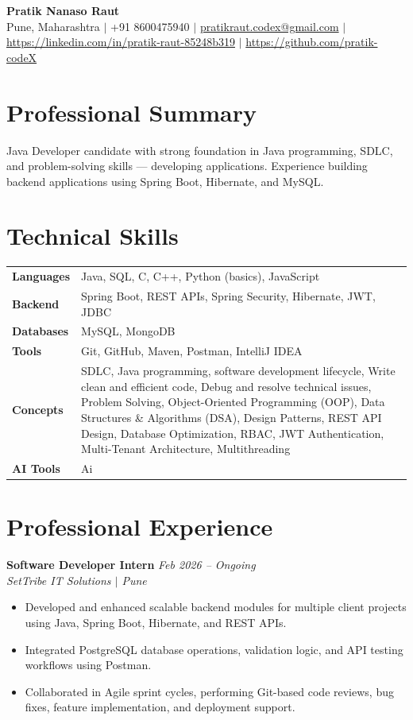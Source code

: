 \documentclass[10.5pt,a4paper]{article}
\begin{document}
\begin{center}
{\Large\bfseries Pratik Nanaso Raut}\\[2pt]
Pune, Maharashtra $|$ +91 8600475940 $|$ \href{mailto:pratikraut.codex@gmail.com}{pratikraut.codex@gmail.com} $|$ \href{https://linkedin.com/in/pratik-raut-85248b319}{https://linkedin.com/in/pratik-raut-85248b319} $|$ \href{https://github.com/pratik-codeX}{https://github.com/pratik-codeX}
\end{center}
\vspace{-2pt}
\section{Professional Summary}
Java Developer candidate with strong foundation in Java programming, SDLC, and problem-solving skills — developing applications. Experience building backend applications using Spring Boot, Hibernate, and MySQL.
\section{Technical Skills}
\begin{tabular}{@{}p{}p{}@{}}
\textbf{Languages} & Java, SQL, C, C++, Python (basics), JavaScript \\[1pt]
\textbf{Backend} & Spring Boot, REST APIs, Spring Security, Hibernate, JWT, JDBC \\[1pt]
\textbf{Databases} & MySQL, MongoDB \\[1pt]
\textbf{Tools} & Git, GitHub, Maven, Postman, IntelliJ IDEA \\[1pt]
\textbf{Concepts} & SDLC, Java programming, software development lifecycle, Write clean and efficient code, Debug and resolve technical issues, Problem Solving, Object-Oriented Programming (OOP), Data Structures \& Algorithms (DSA), Design Patterns, REST API Design, Database Optimization, RBAC, JWT Authentication, Multi-Tenant Architecture, Multithreading \\[1pt]
\textbf{AI Tools} & Ai \\
\end{tabular}
\section{Professional Experience}
\textbf{Software Developer Intern} \hfill \textit{Feb 2026 -- Ongoing}
\\\textit{SetTribe IT Solutions $|$ Pune}
\begin{itemize}
  \item Developed and enhanced scalable backend modules for multiple client projects using Java, Spring Boot, Hibernate, and REST APIs.
  \item Integrated PostgreSQL database operations, validation logic, and API testing workflows using Postman.
  \item Collaborated in Agile sprint cycles, performing Git-based code reviews, bug fixes, feature implementation, and deployment support.
\end{itemize}
\end{document}
